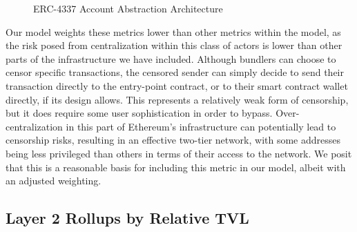 \documentclass[conference]{IEEEtran}
\begin{document}
\begin{figure}[h]

\caption{ERC-4337 Account Abstraction Architecture}
\label{fig:4337 architecture}
\end{figure}

Our model weights these metrics lower than other metrics within the model, as the risk posed from centralization within this class of actors is lower than other parts of the infrastructure we have included.  Although bundlers can choose to censor specific transactions, the censored sender can simply decide to send their transaction directly to the entry-point contract, or to their smart contract wallet directly, if its design allows.  This represents a relatively weak form of censorship, but it does require some user sophistication in order to bypass. Over-centralization in this part of Ethereum's infrastructure can potentially lead to censorship risks, resulting in an effective two-tier network, with some addresses being less privileged than others in terms of their access to the network. We posit that this is a reasonable basis for including this metric in our model, albeit with an adjusted weighting.

\subsection{Layer 2 Rollups by Relative TVL}
\end{document}
